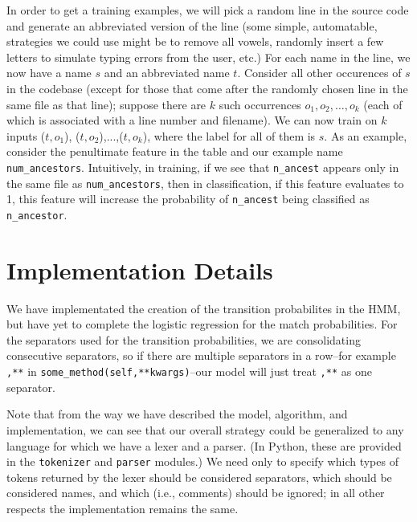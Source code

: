 \documentclass[10pt]{article}
\begin{document}
In order to get a training examples, we will pick a random line in the source code and generate an abbreviated version of the line (some simple, automatable, strategies we could use might be to remove all vowels, randomly insert a few letters to simulate typing errors from the user, etc.) For each name in the line, we now have a name $s$ and an abbreviated name $t$. Consider all other occurences of $s$ in the codebase (except for those that come after the randomly chosen line in the same file as that line); suppose there are $k$ such occurrences $o_1, o_2,\ldots, o_k$ (each of which is associated with a line number and filename). We can now train on $k$ inputs ($t,o_1$), ($t,o_2$),...,($t,o_k$), where the label for all of them is $s$. As an example, consider the penultimate feature in the table and our example name \texttt{num\_ancestors}. Intuitively, in training, if we see that \texttt{n\_ancest} appears only in the same file as \texttt{num\_ancestors}, then in classification, if this feature evaluates to 1, this feature will increase the probability of \texttt{n\_ancest} being classified as \texttt{n\_ancestor}.

\section{Implementation Details}
 
We have implementated the creation of the transition probabilites in the HMM, but have yet to complete the logistic regression for the match probabilities. For the separators used for the transition probabilities, we are consolidating consecutive separators, so if there are multiple separators in a row--for example \texttt{,**} in \texttt{some\_method(self,**kwargs)}--our model will just treat \texttt{,**} as one separator.

Note that from the way we have described the model, algorithm, and implementation, we can see that our overall strategy could be generalized to any language for which we have a lexer and a parser. (In Python, these are provided in the \texttt{tokenizer} and \texttt{parser} modules.) We need only to specify which types of tokens returned by the lexer should be considered separators, which should be considered names, and which (i.e., comments) should be ignored; in all other respects the implementation remains the same. 
\end{document}
